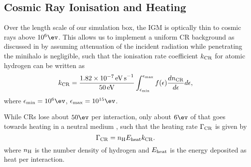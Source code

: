 \subsection{Cosmic Ray Ionisation and Heating}
\label{CRchem}
Over the length scale of our simulation box, the IGM is optically thin to cosmic rays above $10^6\ev$. This allows us to implement a uniform CR background as discussed in  by assuming attenuation of the incident radiation while penetrating the minihalo is negligible, such that the ionisation rate coefficient $k_{\rm \small CR}$ for atomic hydrogen \citep{Schlickeiser2002} can be written as
\begin{equation}
k_{\rm \small CR} = \frac{1.82\times10^{-7}\,{\rm \small eV\,s}^{-1}}{50\,{\rm \small eV}} 
    \int_{\epsilon_{\rm min}}^{\epsilon_{\rm max}} f(\epsilon) \frac{dn_{\rm \tiny CR}}{d\epsilon} d\epsilon,
\end{equation}
where $\epsilon_{\rm min} = 10^6\ev$, $\epsilon_{\rm max}= 10^{15}\ev$.

While CRs lose about $50\ev$ per interaction, only about $6\ev$ of that goes towards heating in a neutral medium \citep{SpitzerScott1969, ShullvanSteenberg1985}, such that the heating rate $\Gamma_{\rm \small CR}$ is given by
\begin{equation}
\Gamma_{\rm \small CR} = n_{\rm \small H} E_{\rm \small heat} k_{\rm \small CR}.
\end{equation}
where $n_{\rm \small H}$ is the number density of hydrogen and $E_{\rm \small heat}$ is the energy deposited as heat per interaction.